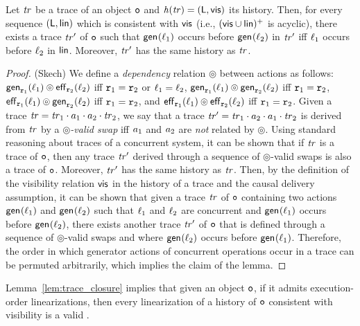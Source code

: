 \begin{lemma}\label{lem:trace_closure}
Let $\mathit{tr}$ be a trace of an object $\mathtt{o}$ and $\mathit{h}({\mathit{tr})}=(\mathsf{L},\mathsf{vis})$ its history. Then, for every sequence $(\mathsf{L},\mathsf{lin})$ which is consistent with $\mathsf{vis}$ (i.e., $(\mathsf{vis}
    \cup \mathsf{lin})^{+}$ is acyclic), there exists a trace $\mathit{tr}'$ of $\mathtt{o}$ such that $\mathsf{gen}_{}(\ell_1)$ occurs before $\mathsf{gen}_{}(\ell_2)$ in $\mathit{tr}'$ iff $\ell_1$ occurs before $\ell_2$ in $\mathsf{lin}$. Moreover, $\mathit{tr}'$ has the same history as $\mathit{tr}$.
\end{lemma}
\begin{proof}(Skech)
We define a \emph{dependency} relation $\circledcirc$ between actions as follows: $\mathsf{gen}_{\mathtt{r}_1}(\ell_1)\circledcirc \mathsf{eff}_{\mathtt{r}_2}(\ell_2)$ iff $\mathtt{r}_1=\mathtt{r}_2$ or $\ell_1=\ell_2$, $\mathsf{gen}_{\mathtt{r}_1}(\ell_1)\circledcirc \mathsf{gen}_{\mathtt{r}_2}(\ell_2)$ iff $\mathtt{r}_1=\mathtt{r}_2$, $\mathsf{eff}_{\mathtt{r}_1}(\ell_1)\circledcirc \mathsf{gen}_{\mathtt{r}_2}(\ell_2)$ iff $\mathtt{r}_1=\mathtt{r}_2$, and $\mathsf{eff}_{\mathtt{r}_1}(\ell_1)\circledcirc \mathsf{eff}_{\mathtt{r}_2}(\ell_2)$ iff $\mathtt{r}_1=\mathtt{r}_2$. Given a trace $\mathit{tr}=\mathit{tr}_1\cdot a_1\cdot a_2\cdot\mathit{tr}_2$, we say that a trace $\mathit{tr}'=\mathit{tr}_1\cdot a_2\cdot a_1\cdot\mathit{tr}_2$ is derived from $\mathit{tr}$ by a \emph{$\circledcirc$-valid swap} iff $a_1$ and $a_2$ are \emph{not} related by $\circledcirc$. Using standard reasoning about traces of a concurrent system, it can be shown that if $\mathit{tr}$ is a trace of $\mathtt{o}$, then any trace $\mathit{tr}'$ derived through a sequence of $\circledcirc$-valid swaps is also a trace of $\mathtt{o}$. Moreover, $\mathit{tr}'$ has the same history as $\mathit{tr}$. Then, by the definition of the visibility relation $\mathsf{vis}$ in the history of a trace and the causal delivery assumption, it can be shown that given a trace $\mathit{tr}$ of $\mathtt{o}$ containing two actions $\mathsf{gen}_{}(\ell_1)$ and $\mathsf{gen}_{}(\ell_2)$ such that $\ell_1$ and $\ell_2$ are concurrent and $\mathsf{gen}_{}(\ell_1)$ occurs before $\mathsf{gen}_{}(\ell_2)$, there exists another trace $\mathit{tr}'$ of $\mathtt{o}$ that is defined through a sequence of $\circledcirc$-valid swaps and where $\mathsf{gen}_{}(\ell_2)$ occurs before $\mathsf{gen}_{}(\ell_1)$. Therefore, the order in which generator actions of concurrent operations occur in a trace can be permuted arbitrarily, which implies the claim of the lemma.
\end{proof}

Lemma~\ref{lem:trace_closure} implies that given an \crdtlinearizable{} object $\mathtt{o}$, if it admits execution-order linearizations, then every linearization of a history of $\mathtt{o}$ consistent with visibility is a valid \crdtlinearization{}.

